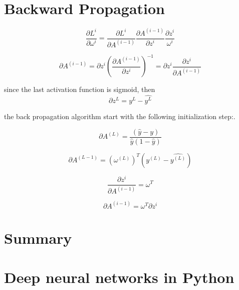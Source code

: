 \documentclass[4apaper,12pt]{book}
\begin{document}
\section{Backward Propagation}
\begin{description}
\item $$
  \frac{\partial{L^i}}{\partial{\omega^i}}=
    \frac{\partial{L^i}}{\partial{A^{(i-1)}}}
      \frac{\partial{A^{(i-1)}}}{\partial{z^i}}
        \frac{\partial{z^i}}{\omega^i}
        $$
      \item $$\partial{A^{(i-1)}}=\partial{z^i}
        (\frac{\partial{A^{(i-1)}}}{\partial{z^i}})^{-1}=
        \partial{z^i}\frac{\partial{z^i}}{\partial{A^{(i-1)}}}
        $$

      \item since the last activation function is sigmoid, then $$\partial{z^L}=y^L-\hat{y^L}$$
        \item the back propagation algorithm start with the following initialization step:.
        \item $$ \partial{A^{(L)}} = \frac{(\hat{y}-y)}{\hat{y}(1-\hat{y})} $$
        \item $$\partial{A^{(L-1)}} = (\omega^{(L)})^T(y^{(L)}-\hat{y^{(L)}})$$
        \item $$ \frac{\partial{z^i}}{\partial{A^{(i-1)}}} = \omega^T $$
        \item $$\partial{A^{(i-1)}}=\omega^T\partial{z^i}$$

\end{description}

\section{Summary}
\begin{description}
\item
\end{description}

\section{Deep neural networks in Python}
\begin{description}
\item
\end{description}
\end{document}
